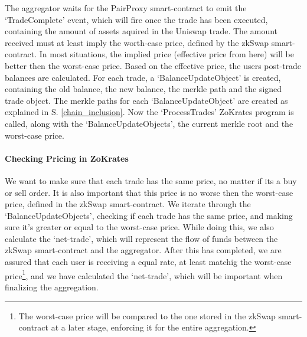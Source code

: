 \documentclass[../../thesis.tex]{subfiles}
\begin{document}
The aggregator waits for the PairProxy smart-contract to emit the `TradeComplete' event, which will fire once the trade has been executed, containing the amount of assets aquired in the Uniswap trade. The amount received must at least imply the worth-case price, defined by the zkSwap smart-contract. In most situations, the implied price (effective price from here) will be better then the worst-case price. Based on the effective price, the users post-trade balances are calculated. For each trade, a `BalanceUpdateObject' is created, containing the old balance, the new balance, the merkle path and the signed trade object. The merkle paths for each `BalanceUpdateObject' are created as explained in S. \ref{chain_inclusion}. Now the `ProcessTrades' ZoKrates program is called, along with the `BalanceUpdateObjects', the current merkle root and the worst-case price.

\paragraph{Checking Pricing in ZoKrates}
We want to make sure that each trade has the same price, no matter if its a buy or sell order. It is also important that this price is no worse then the worst-case price, defined in the zkSwap smart-contract. We iterate through the `BalanceUpdateObjects', checking if each trade has the same price, and making sure it's greater or equal to the worst-case price. While doing this, we also calculate the `net-trade', which will represent the flow of funds between the zkSwap smart-contract and the aggregator. After this has completed, we are assured that each user is receiving a equal rate, at least matchig the worst-case price\footnote{The worst-case price will be compared to the one stored in the zkSwap smart-contract at a later stage, enforcing it for the entire aggregation.}, and we have calculated the `net-trade', which will be important when finalizing the aggregation.
\end{document}
